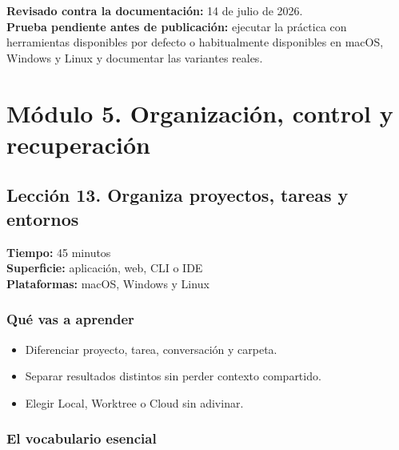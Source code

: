 \documentclass[10pt,a4paper,openany]{book}
\providecommand{\tightlist}{\setlength{\itemsep}{0.18em}\setlength{\parskip}{0pt}}
\begin{document}
\textbf{Revisado contra la documentación:} 14 de julio de 2026.\\
\textbf{Prueba pendiente antes de publicación:} ejecutar la práctica con
herramientas disponibles por defecto o habitualmente disponibles en
macOS, Windows y Linux y documentar las variantes reales.

\chapter{Módulo 5. Organización, control y
recuperación}\label{muxf3dulo-5.-organizaciuxf3n-control-y-recuperaciuxf3n}

\clearpage

\section{Lección 13. Organiza proyectos, tareas y
entornos}\label{lecciuxf3n-13.-organiza-proyectos-tareas-y-entornos}

\begin{metabox}

\textbf{Tiempo:} 45 minutos\\
\textbf{Superficie:} aplicación, web, CLI o IDE\\
\textbf{Plataformas:} macOS, Windows y Linux

\end{metabox}

\subsection{Qué vas a aprender}\label{quuxe9-vas-a-aprender-12}

\begin{itemize}
\tightlist
\item
  Diferenciar proyecto, tarea, conversación y carpeta.
\item
  Separar resultados distintos sin perder contexto compartido.
\item
  Elegir Local, Worktree o Cloud sin adivinar.
\end{itemize}

\subsection{El vocabulario esencial}\label{el-vocabulario-esencial}
\end{document}
